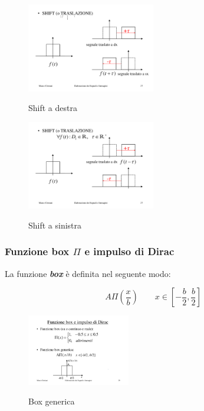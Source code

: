 \documentclass[a4paper]{article}
\begin{document}
	\begin{figure}[!htp]
		\centering
		\includegraphics[width=0.5\textwidth]{img/op_shift_dx.pdf}\label{op_shift_dx}
		\caption{Shift a destra}
		\includegraphics[width=0.5\textwidth]{img/op_shift_sx.pdf}\label{op_shift_sx}
		\caption{Shift a sinistra}
	\end{figure}

	\newpage
	
	\subsubsection{Funzione box $\Pi$ e impulso di Dirac}
	
	La funzione \textbf{\emph{box}} è definita nel seguente modo:
	
	\begin{equation*}
		A \Pi(\dfrac{x}{b}) \hspace{2em} x\in\left[-\dfrac{b}{2}, \dfrac{b}{2}\right]
	\end{equation*}

	\begin{figure}[!htp]
		\centering
		\includegraphics[width=0.4\textwidth]{img/box.pdf}\label{box}
		\caption{Box generica}
	\end{figure}
\end{document}

